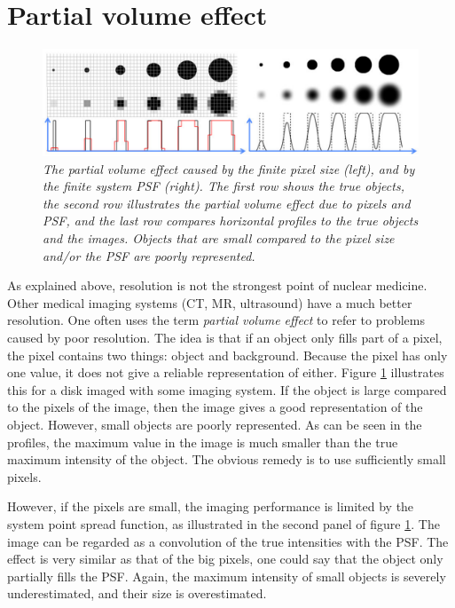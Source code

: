 \section{Partial volume effect \label{sec:pv}}
\begin{figure}[tb]
\centering
\includegraphics[width=\figbig]{figs/fig_pv.pdf}
\caption{\label{fig:pv} \emph{The partial volume effect caused by the
finite pixel size (left), and by the finite system PSF (right). The
first row shows the true objects, the second row illustrates the
partial volume effect due to pixels and PSF, and the last row compares
horizontal profiles to the true objects and the images.  Objects that
are small compared to the pixel size and/or the PSF are poorly
represented.}}
\end{figure}
%
As explained above, resolution is not the strongest point of nuclear
medicine. Other medical imaging systems (CT, MR, ultrasound) have a
much better resolution. One often uses the term {\em partial volume
effect} to refer to problems caused by poor resolution. The idea is
that if an object only fills part of a pixel, the pixel contains two
things: object and background. Because the pixel has only one value,
it does not give a reliable representation of either. Figure
\ref{fig:pv} illustrates this for a disk imaged with some imaging
system. If the object is large compared to the pixels of the image,
then the image gives a good representation of the object. However,
small objects are poorly represented. As can be seen in the profiles,
the maximum value in the image is much smaller than the true maximum
intensity of the object. The obvious remedy is to use sufficiently
small pixels.

However, if the pixels are small, the imaging performance is limited
by the system point spread function, as illustrated in the second
panel of figure \ref{fig:pv}. The image can be regarded as a
convolution of the true intensities with the PSF. The effect is very
similar as that of the big pixels, one could say that the object only
partially fills the PSF. Again, the maximum intensity of small objects
is severely underestimated, and their size is overestimated.

